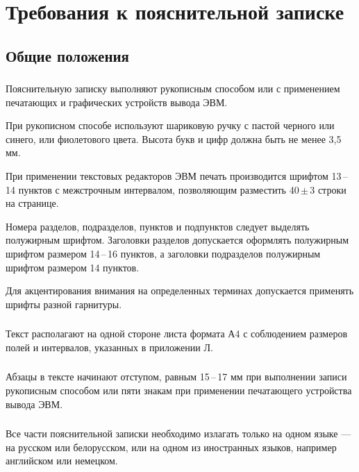 
\section{Требования к пояснительной записке}

\subsection{Общие положения}

\subsubsection{} 
Пояснительную  записку  выполняют  рукописным  способом  или  с применением печатающих и графических устройств вывода ЭВМ. 

При рукописном способе используют шариковую ручку с пастой черного или синего, или фиолетового цвета. Высота букв и цифр должна быть не менее 3,5 мм. 

При применении текстовых редакторов ЭВМ печать производится шрифтом 13\,--\,14  пунктов  с  межстрочным  интервалом,  позволяющим  разместить  
40\,\( \pm \)\,3 строки на странице. 

Номера  разделов,  подразделов,  пунктов и подпунктов следует выделять полужирным  шрифтом.  Заголовки  разделов  допускается  оформлять  полужирным шрифтом размером 14\,--\,16 пунктов, а заголовки подразделов полужирным шрифтом размером 14 пунктов. 

Для  акцентирования  внимания  на  определенных  терминах  допускается применять шрифты разной гарнитуры. 

\subsubsection{}
Текст располагают на одной стороне листа формата А4 с соблюдением размеров полей и интервалов, указанных в приложении Л.

\subsubsection{}
Абзацы в тексте начинают отступом, равным 15\,--\,17 мм при выполнении  записи  рукописным  способом  или  пяти  знакам  при  применении  печатающего устройства вывода ЭВМ.

\subsubsection{} 
Все  части  пояснительной  записки  необходимо  излагать  только  на одном языке --- на русском или белорусском, или на одном из иностранных языков, например английском или немецком.


